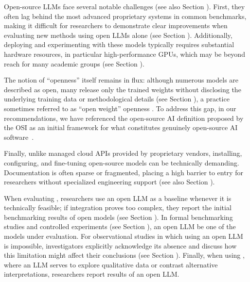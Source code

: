 Open-source LLMs face several notable challenges (see also Section \limitationsmitigations).
First, they often lag behind the most advanced proprietary systems in common benchmarks, making it difficult for researchers to demonstrate clear improvements when evaluating new methods using open LLMs alone (see Section \benchmarksmetrics).
Additionally, deploying and experimenting with these models typically requires substantial hardware resources, in particular high-performance GPUs, which may be beyond reach for many academic groups (see Section \toolarchitecture). 

The notion of ``openness'' itself remains in flux: although numerous models are described as open, many release only the trained weights without disclosing the underlying training data or methodological details (see Section \modelversion), a practice sometimes referred to as ``open weight'' openness \cite{Gibney2024}.
To address this gap, in our recommendations, we have referenced the open-source AI definition proposed by the OSI as an initial framework for what constitutes genuinely open-source AI software~\cite{OSIAI2024}. 

Finally, unlike managed cloud APIs provided by proprietary vendors, installing, configuring, and fine-tuning open-source models can be technically demanding.
Documentation is often sparse or fragmented, placing a high barrier to entry for researchers without specialized engineering support (see also Section \limitationsmitigations).


When evaluating \newtools, researchers \should use an open LLM as a baseline whenever it is technically feasible; if integration proves too complex, they \should report the initial benchmarking results of open models (see Section \benchmarksmetrics).
In formal benchmarking studies and controlled experiments (see Section \benchmarkingtasks), an open LLM \must be one of the models under evaluation.
For observational studies in which using an open LLM is impossible, investigators \should explicitly acknowledge its absence and discuss how this limitation might affect their conclusions (see Section \limitationsmitigations).
Finally, when using \synthesis,  where an LLM serves to explore qualitative data or contrast alternative interpretations, researchers \may report results of an open LLM.
